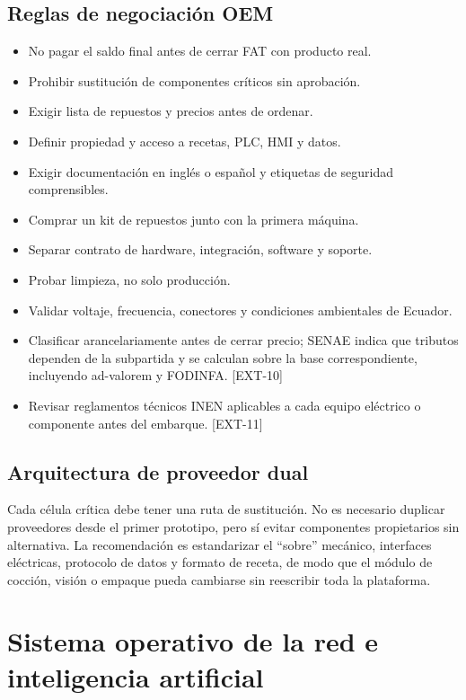 \documentclass[11pt,a4paper]{article}
\begin{document}
\subsection{Reglas de negociación OEM}
\begin{itemize}
\item No pagar el saldo final antes de cerrar FAT con producto real.
\item Prohibir sustitución de componentes críticos sin aprobación.
\item Exigir lista de repuestos y precios antes de ordenar.
\item Definir propiedad y acceso a recetas, PLC, HMI y datos.
\item Exigir documentación en inglés o español y etiquetas de seguridad comprensibles.
\item Comprar un kit de repuestos junto con la primera máquina.
\item Separar contrato de hardware, integración, software y soporte.
\item Probar limpieza, no solo producción.
\item Validar voltaje, frecuencia, conectores y condiciones ambientales de Ecuador.
\item Clasificar arancelariamente antes de cerrar precio; SENAE indica que tributos dependen de la
subpartida y se calculan sobre la base correspondiente, incluyendo ad-valorem y FODINFA. [EXT-10]
\item Revisar reglamentos técnicos INEN aplicables a cada equipo eléctrico o componente antes del
embarque. [EXT-11]
\end{itemize}

\subsection{Arquitectura de proveedor dual}
Cada célula crítica debe tener una ruta de sustitución. No es necesario duplicar proveedores desde el
primer prototipo, pero sí evitar componentes propietarios sin alternativa. La recomendación es
estandarizar el “sobre” mecánico, interfaces eléctricas, protocolo de datos y formato de receta, de modo
que el módulo de cocción, visión o empaque pueda cambiarse sin reescribir toda la plataforma.

\section{Sistema operativo de la red e inteligencia artificial}
\end{document}
